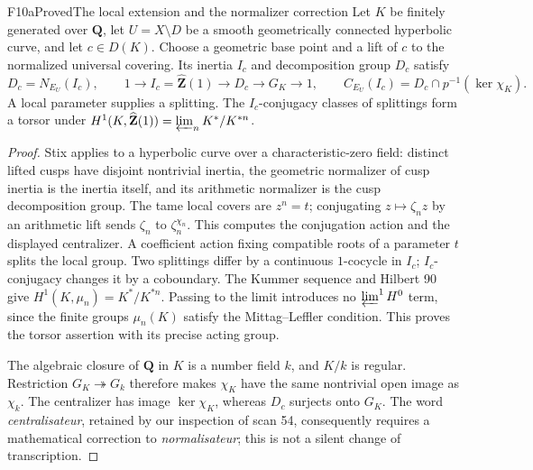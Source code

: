 \begin{result}{F10a}{Proved}{The local extension and the normalizer correction}
Let $K$ be finitely generated over $\mathbf Q$, let
$U=X\setminus D$ be a smooth geometrically connected hyperbolic curve,
and let $c\in D(K)$. Choose a geometric base point and a lift of $c$
to the normalized universal covering. Its inertia $I_c$ and
decomposition group $D_c$ satisfy
\[
 D_c=N_{E_U}(I_c),\qquad
 1\longrightarrow I_c=\widehat{\mathbf Z}(1)
 \longrightarrow D_c\longrightarrow G_K\longrightarrow1,
 \qquad
 C_{E_U}(I_c)=D_c\cap p^{-1}(\ker\chi_K).
\]
A local parameter supplies a splitting. The $I_c$-conjugacy classes of
splittings form a torsor under
$H^1(K,\widehat{\mathbf Z}(1))=\varprojlim_n K^*/K^{*n}$.
\end{result}
\begin{proof}
Stix \cite[Proposition 11; Corollary 12]{RootStix} applies to a
hyperbolic curve over a characteristic-zero field: distinct lifted
cusps have disjoint nontrivial inertia, the geometric normalizer of
cusp inertia is the inertia itself, and its arithmetic normalizer is
the cusp decomposition group. The tame local covers are $z^n=t$;
conjugating $z\mapsto\zeta_nz$ by an arithmetic lift sends
$\zeta_n$ to $\zeta_n^{\chi_n}$. This computes the conjugation
action and the displayed centralizer. A coefficient action fixing
compatible roots of a parameter $t$ splits the local group.
Two splittings differ by a continuous $1$-cocycle in $I_c$;
$I_c$-conjugacy changes it by a coboundary. The Kummer sequence
and Hilbert 90 give $H^1(K,\mu_n)=K^*/K^{*n}$. Passing to the limit
introduces no $\varprojlim^1H^0$ term, since the finite groups
$\mu_n(K)$ satisfy the Mittag--Leffler condition. This proves the
torsor assertion with its precise acting group.

The algebraic closure of $\mathbf Q$ in $K$ is a number field $k$,
and $K/k$ is regular. Restriction $G_K\twoheadrightarrow G_k$
therefore makes $\chi_K$ have the same nontrivial open image as
$\chi_k$. The centralizer has image $\ker\chi_K$, whereas $D_c$
surjects onto $G_K$. The word \emph{centralisateur}, retained by our
inspection of scan 54, consequently requires a mathematical correction
to \emph{normalisateur}; this is not a silent change of transcription.
\end{proof}

